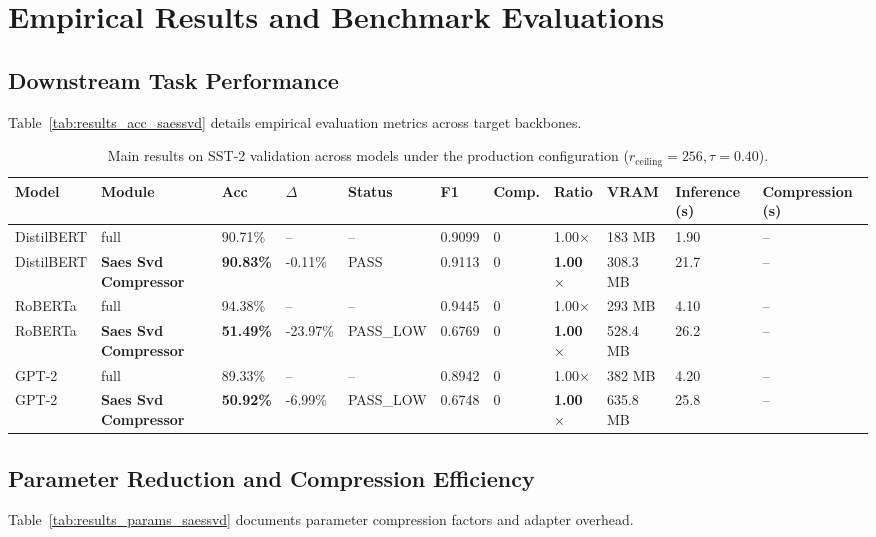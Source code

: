 \section{Empirical Results and Benchmark Evaluations}

\subsection{Downstream Task Performance}
Table~\ref{tab:results_acc_saessvd} details empirical evaluation metrics across target backbones.

\begin{table}[t]
\centering
\small
\begin{tabular}{lllllllllll}
\toprule
\textbf{Model} & \textbf{Module} & \textbf{Acc} & \textbf{$\Delta$} & \textbf{Status} & \textbf{F1} & \textbf{Comp.} & \textbf{Ratio} & \textbf{VRAM} & \textbf{Inference (s)} & \textbf{Compression (s)} \\
\midrule
DistilBERT & full & 90.71\% & -- & -- & 0.9099 & 0 & 1.00$\times$ & 183 MB & 1.90 & -- \\
DistilBERT & \textbf{Saes Svd Compressor} & \textbf{90.83\%} & -0.11\% & PASS & 0.9113 & 0 & \textbf{1.00$\times$} & 308.3 MB & 21.7 & -- \\
RoBERTa & full & 94.38\% & -- & -- & 0.9445 & 0 & 1.00$\times$ & 293 MB & 4.10 & -- \\
RoBERTa & \textbf{Saes Svd Compressor} & \textbf{51.49\%} & -23.97\% & PASS\_LOW & 0.6769 & 0 & \textbf{1.00$\times$} & 528.4 MB & 26.2 & -- \\
GPT-2 & full & 89.33\% & -- & -- & 0.8942 & 0 & 1.00$\times$ & 382 MB & 4.20 & -- \\
GPT-2 & \textbf{Saes Svd Compressor} & \textbf{50.92\%} & -6.99\% & PASS\_LOW & 0.6748 & 0 & \textbf{1.00$\times$} & 635.8 MB & 25.8 & -- \\
\bottomrule
\end{tabular}
\caption{Main results on SST-2 validation across models under the production configuration ($r_{\mathrm{ceiling}}=256, \tau=0.40$).}
\label{tab:main_sst2}
\end{table}

\subsection{Parameter Reduction and Compression Efficiency}
Table~\ref{tab:results_params_saessvd} documents parameter compression factors and adapter overhead.

